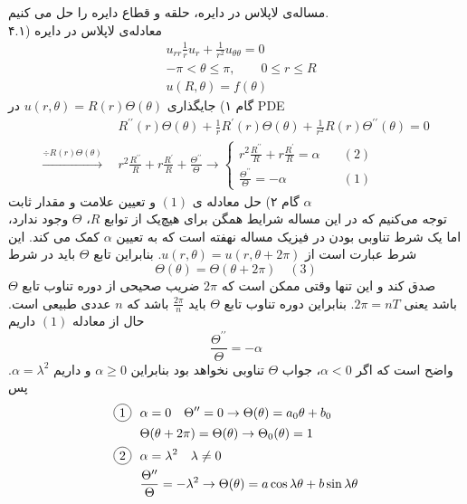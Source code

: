 مساله‌ی لاپلاس در دایره، حلقه و قطاع دایره را حل می کنیم.\\
۴.۱) معادله‌ی لاپلاس در دایره
\[\begin{aligned}
	& u_{rr}\frac1ru_r+\frac1{r^2}u_{\theta\theta}=0
	\\ &
	-\pi<\theta\le\pi,\qquad 0\le r\le R
	\\ &
	u(R,\theta)=f(\theta)
\end{aligned}\]
گام ۱) جایگذاری
$u(r,\theta)=R(r)\Theta(\theta)$
در PDE
\[\begin{aligned}
	& R^{\prime\prime}(r)\Theta(\theta)+\frac 1rR^\prime(r)\Theta(\theta)+\frac1{r^2}R(r)\Theta^{\prime\prime}(\theta)=0
	\\
	\xrightarrow{\div R(r)\Theta(\theta)}\ \ &
	r^2\frac{R^{\prime\prime}}{R}+r\frac{R^\prime}{R}+\frac{\Theta^{\prime\prime}}{\Theta}\rightarrow\begin{cases}
		r^2\frac{R^{\prime\prime}}{R}+r\frac{R^\prime}R=\alpha \quad & (2)\\
		\frac{\Theta^{\prime\prime}}{\Theta}=-\alpha \quad & (1)
	\end{cases}
\end{aligned}\]
گام ۲) حل معادله ی $(1)$ و تعیین علامت و مقدار ثابت
$\alpha$\\
توجه می‌کنیم که در این مساله شرایط همگن برای هیچ‌یک از توابع
$R$،
$\Theta$
وجود ندارد، اما یک شرط تناوبی بودن در فیزیک مساله نهفته است که به تعیین
$\alpha$
کمک می کند. این شرط عبارت است از
$u(r,\theta)=u(r,\theta+2\pi)$.
بنابراین تابع
$\Theta$
باید در شرط
\[
\Theta(\theta)=\Theta(\theta+2\pi) \quad (3)
\]
صدق کند و این تنها وقتی ممکن است که
$2\pi$
ضریب صحیحی از دوره تناوب تابع
$\Theta$
باشد یعنی
$2\pi=nT$.
بنابراین دوره تناوب تابع
$\Theta$
باید
$\frac{2\pi}n$
باشد که
$n$
عددی طبیعی است. حال از معادله
$(1)$
داریم
\[
\frac{\Theta^{\prime\prime}}\Theta=-\alpha
\]
واضح است که اگر
$\alpha<0$،
جواب
$\Theta$
تناوبی نخواهد بود بنابراین
$\alpha\ge0$
و داریم
$\alpha=\lambda^2$.
پس
\[\begin{aligned}
	& \begin{aligned}
		\circled1 \ \ & \alpha=0 \quad \Theta^{\prime\prime}=0\rightarrow \Theta(\theta)=a_0\theta+b_0
		\\ &
		\Theta(\theta+2\pi)=\Theta(\theta)\rightarrow \Theta_0(\theta)=1
	\end{aligned}
	\\ &
	\begin{aligned}
		\circled2 \ \ &
		\alpha=\lambda^2 \quad \lambda\ne0
		\\ &
		\frac{\Theta^{\prime\prime}}\Theta=-\lambda^2\rightarrow \Theta(\theta)=a\cos{\lambda\theta}+b\sin{\lambda\theta}
	\end{aligned}
\end{aligned}\]
